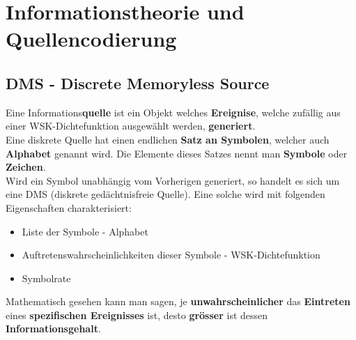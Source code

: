 \section{Informationstheorie und Quellencodierung }
\subsection{DMS - Discrete Memoryless Source}
Eine Informations\textbf{quelle} ist ein Objekt welches \textbf{Ereignise}, welche zufällig aus einer
WSK-Dichtefunktion ausgewählt werden, \textbf{generiert}. \\ 
Eine diskrete Quelle hat einen endlichen \textbf{Satz an Symbolen}, welcher auch \textbf{Alphabet}
genannt wird. Die Elemente dieses Satzes nennt man \textbf{Symbole} oder \textbf{Zeichen}. \\
Wird ein Symbol unabhängig vom Vorherigen generiert, so handelt es sich um eine DMS (diskrete
gedächtnisfreie Quelle). Eine solche wird mit folgenden Eigenschaften charakterisiert:
\begin{itemize}\addtolength{\itemsep}{-0.3\baselineskip}
  \item Liste der Symbole - Alphabet
  \item Auftretenswahrscheinlichkeiten dieser Symbole - WSK-Dichtefunktion
  \item Symbolrate 
\end{itemize} 

Mathematisch gesehen kann man sagen, je \textbf{unwahrscheinlicher} das \textbf{Eintreten} eines \textbf{spezifischen
Ereignisses} ist, desto \textbf{grösser} ist dessen \textbf{Informationsgehalt}.

